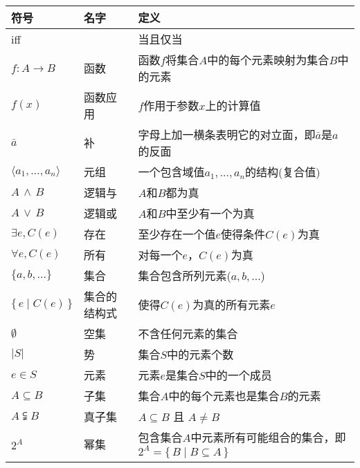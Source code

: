\documentclass[onecolumn,11pt]{article}
\newcommand{\na}{\ensuremath{\bar a}}
\begin{document}
\begin{tabu}
  to
  \toprule
\rowfont\bfseries
符号 & \normalsize 名字 & \normalsize 定义 \\
\midrule

iff & & 当且仅当 \\

$f:A\to B$ & 函数 & 函数$f$将集合$A$中的每个元素映射为集合$B$中的元素\\

$f(x)$ & 函数应用 & $f$作用于参数$x$上的计算值\\

$\na$ & 补 & 字母上加一横条表明它的对立面，即$\na$是$a$的反面\\

$\langle a_1,\ldots,a_n\rangle$ & 元组 & 一个包含域值$a_1,\ldots, a_n$的结构(复合值)\\

$A\,\wedge\, B$ & 逻辑与 & $A$和$B$都为真\\

$A\,\vee\, B$ & 逻辑或 & $A$和$B$中至少有一个为真\\

$\exists e,C(e)$ & 存在 & 至少存在一个值$e$使得条件$C(e)$为真\\

$\forall e,C(e)$ & 所有 & 对每一个$e$，$C(e)$为真\\

$\{a, b, \ldots\}$ & 集合 & 集合包含所列元素($a,b,\ldots$) \\

$\{\,e \mid C(e)\,\}$ & 集合的结构式 &使得$C(e)$为真的所有元素$e$\\

$\emptyset$ & 空集 & 不含任何元素的集合 \\

$\lvert S\rvert$ & 势 & 集合$S$中的元素个数 \\

$e\in S$ & 元素 & 元素$e$是集合$S$中的一个成员 \\

$A\subseteq B$ & 子集 & 集合$A$中的每个元素也是集合$B$的元素\\

$A\subsetneqq B$ & 真子集 & $A\subseteq B$ 且 $A\ne B$\\

$2^A$ & 幂集 & 包含集合$A$中元素所有可能组合的集合，即$2^A=\{\,B\mid B\subseteq
A\,\}$ \\


\end{tabu}
\end{document}
